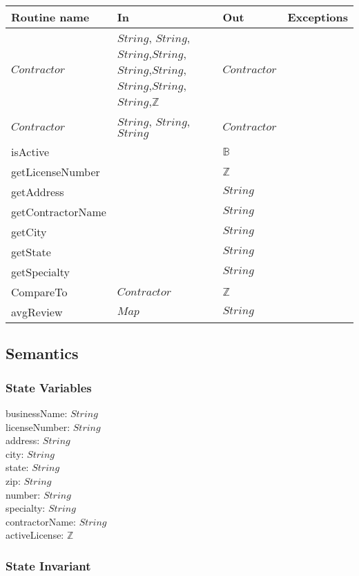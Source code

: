 \documentclass[12pt]{article}
\begin{document}
\begin{tabular}{| l | l | l | l |}
\hline
\textbf{Routine name} & \textbf{In} & \textbf{Out} & \textbf{Exceptions}\\
\hline
$Contractor$ & $String$, $String$, $String$,$String$,$String$,$String$,$String$,$String$,$String$,$\mathbb{Z}$  & $Contractor$ & \\
\hline
$Contractor$ & $String$, $String$, $String$ & $Contractor$ & ~\\
\hline
isActive & ~ & $\mathbb{B}$ & ~\\
\hline
getLicenseNumber & ~ &  $\mathbb{Z}$ &
\\
\hline
getAddress & ~ & $String$ & \\
\hline
getContractorName & ~ & $String$ & \\
\hline 
getCity & ~ & $String$ & \\
\hline 
getState & ~ & $String$ & \\
\hline 
getSpecialty & ~ & $String$ & \\
\hline 
CompareTo & $Contractor$ & $\mathbb{Z}$ & \\
\hline 
avgReview & $Map$ & $String$ & \\
\hline 
\end{tabular}

\subsection* {Semantics}

\subsubsection* {State Variables}

businessName: $String$\\
licenseNumber: $String$\\
address: $String$\\
city: $String$\\
state: $String$\\
zip: $String$\\
number: $String$\\
specialty: $String$\\
contractorName: $String$\\
activeLicense: $\mathbb{Z}$

\subsubsection* {State Invariant}
\end{document}
